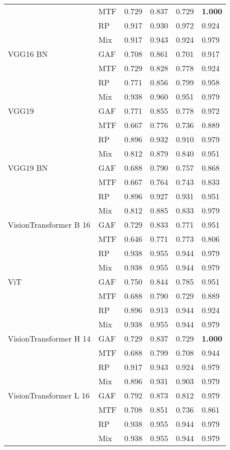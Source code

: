 \begin{longtable}[t]{llllll}
 & MTF & 0.729 & 0.837 & 0.729 & \textbf{1.000} \\
 & RP & 0.917 & 0.930 & 0.972 & 0.924 \\
 & Mix & 0.917 & 0.943 & 0.924 & 0.979 \\
VGG16 BN & GAF & 0.708 & 0.861 & 0.701 & 0.917 \\
 & MTF & 0.729 & 0.828 & 0.778 & 0.924 \\
 & RP & 0.771 & 0.856 & 0.799 & 0.958 \\
 & Mix & 0.938 & 0.960 & 0.951 & 0.979 \\
VGG19 & GAF & 0.771 & 0.855 & 0.778 & 0.972 \\
 & MTF & 0.667 & 0.776 & 0.736 & 0.889 \\
 & RP & 0.896 & 0.932 & 0.910 & 0.979 \\
 & Mix & 0.812 & 0.879 & 0.840 & 0.951 \\
VGG19 BN & GAF & 0.688 & 0.790 & 0.757 & 0.868 \\
 & MTF & 0.667 & 0.764 & 0.743 & 0.833 \\
 & RP & 0.896 & 0.927 & 0.931 & 0.951 \\
 & Mix & 0.812 & 0.885 & 0.833 & 0.979 \\
VisionTransformer B 16 & GAF & 0.729 & 0.833 & 0.771 & 0.951 \\
 & MTF & 0.646 & 0.771 & 0.773 & 0.806 \\
 & RP & 0.938 & 0.955 & 0.944 & 0.979 \\
 & Mix & 0.938 & 0.955 & 0.944 & 0.979 \\
ViT & GAF & 0.750 & 0.844 & 0.785 & 0.951 \\
 & MTF & 0.688 & 0.790 & 0.729 & 0.889 \\
 & RP & 0.896 & 0.913 & 0.944 & 0.924 \\
 & Mix & 0.938 & 0.955 & 0.944 & 0.979 \\
VisionTransformer H 14 & GAF & 0.729 & 0.837 & 0.729 & \textbf{1.000} \\
 & MTF & 0.688 & 0.799 & 0.708 & 0.944 \\
 & RP & 0.917 & 0.943 & 0.924 & 0.979 \\
 & Mix & 0.896 & 0.931 & 0.903 & 0.979 \\
VisionTransformer L 16 & GAF & 0.792 & 0.873 & 0.812 & 0.979 \\
 & MTF & 0.708 & 0.851 & 0.736 & 0.861 \\
 & RP & 0.938 & 0.955 & 0.944 & 0.979 \\
 & Mix & 0.938 & 0.955 & 0.944 & 0.979 \\

\end{longtable}
